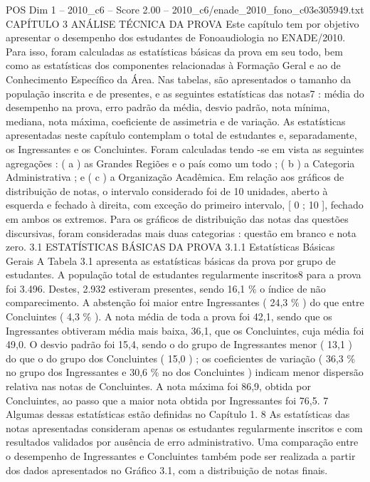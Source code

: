 \begin{textsample}{POS Dim 1 – 2010\_c6 – Score 2.00 – 2010\_c6/enade\_2010\_fono\_c03e305949.txt}  \label{ex:f1_pos_161}
CAPÍTULO 3 ANÁLISE TÉCNICA DA PROVA Este capítulo tem por objetivo apresentar o desempenho dos estudantes de Fonoaudiologia no ENADE/2010.
Para isso, foram calculadas as estatísticas básicas da prova em seu todo, bem como as estatísticas dos componentes relacionadas à Formação Geral e ao de Conhecimento Específico da Área.
Nas tabelas, são apresentados o tamanho da população inscrita e de presentes, e as seguintes estatísticas das notas7 : média do desempenho na prova, erro padrão da média, desvio padrão, nota mínima, mediana, nota máxima, coeficiente de assimetria e de variação.
As estatísticas apresentadas neste capítulo contemplam o total de estudantes e, separadamente, os Ingressantes e os Concluintes.
Foram calculadas tendo -se em vista as seguintes agregações : ( a ) as Grandes Regiões e o país como um todo ; ( b ) a Categoria Administrativa ; e ( c ) a Organização Acadêmica.
Em relação aos gráficos de distribuição de notas, o intervalo considerado foi de 10 unidades, aberto à esquerda e fechado à direita, com exceção do primeiro intervalo, [ 0 ; 10 ], fechado em ambos os extremos.
Para os gráficos de distribuição das notas das questões discursivas, foram consideradas mais duas categorias : questão em branco e nota zero. 3.1 ESTATÍSTICAS BÁSICAS DA PROVA 3.1.1 Estatísticas Básicas Gerais A Tabela 3.1 apresenta as estatísticas básicas da prova por grupo de estudantes.
A população total de estudantes regularmente inscritos8 para a prova foi 3.496.
Destes, 2.932 estiveram presentes, sendo 16,1 \% o índice de não comparecimento.
A abstenção foi maior entre Ingressantes ( 24,3 \% ) do que entre Concluintes ( 4,3 \% ).
A nota média de toda a prova foi 42,1, sendo que os Ingressantes obtiveram média mais baixa, 36,1, que os Concluintes, cuja média foi 49,0.
O desvio padrão foi 15,4, sendo o do grupo de Ingressantes menor ( 13,1 ) do que o do grupo dos Concluintes ( 15,0 ) ; os coeficientes de variação ( 36,3 \% no grupo dos Ingressantes e 30,6 \% no dos Concluintes ) indicam menor dispersão relativa nas notas de Concluintes.
A nota máxima foi 86,9, obtida por Concluintes, ao passo que a maior nota obtida por Ingressantes foi 76,5. 7 Algumas dessas estatísticas estão definidas no Capítulo 1. 8 As estatísticas das notas apresentadas consideram apenas os estudantes regularmente inscritos e com resultados validados por ausência de erro administrativo.
Uma comparação entre o desempenho de Ingressantes e Concluintes também pode ser realizada a partir dos dados apresentados no Gráfico 3.1, com a distribuição de notas finais.

\end{textsample}
